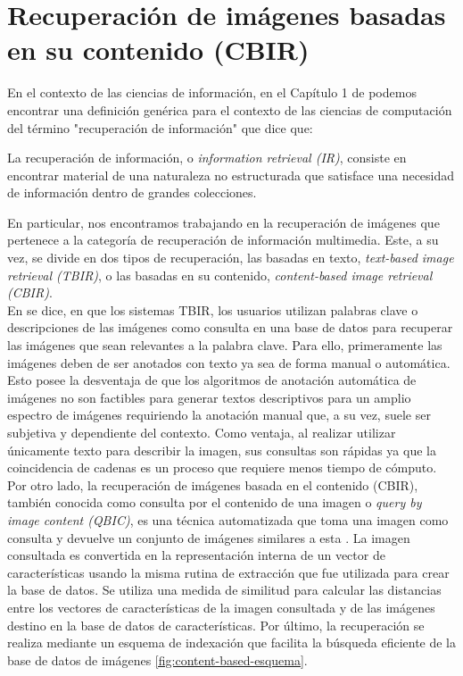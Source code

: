 \chapter{Recuperación de imágenes basadas en su contenido (CBIR)}

En el contexto de las ciencias de información, en el Capítulo 1 de \cite{10.5555/1394399} podemos encontrar una definición genérica para el contexto de las ciencias de computación del término "recuperación de información" que dice que:

\begin{definicion}
La recuperación de información, o \emph{information retrieval (IR)}, consiste en encontrar material de una naturaleza no estructurada que satisface una necesidad de información dentro de grandes colecciones.
\end{definicion}

En particular, nos encontramos trabajando en la recuperación de imágenes que pertenece a la categoría de recuperación de información multimedia. Este, a su vez, se divide en dos tipos de recuperación, las basadas en texto, \emph{text-based image retrieval (TBIR)}, o las basadas en su contenido, \emph{content-based image retrieval (CBIR)}.\\

En \cite{content-based} se dice, en que los sistemas TBIR, los usuarios utilizan palabras clave o descripciones de las imágenes como consulta en una base de datos para recuperar las imágenes que sean relevantes a la palabra clave. Para ello, primeramente las imágenes deben de ser anotados con texto ya sea de forma manual o automática. Esto posee la desventaja de que los algoritmos de anotación automática de imágenes no son factibles para generar textos descriptivos para un amplio espectro de imágenes requiriendo la anotación manual que, a su vez, suele ser subjetiva y dependiente del contexto. Como ventaja, al realizar utilizar únicamente texto para describir la imagen, sus consultas son rápidas ya que la coincidencia de cadenas es un proceso que requiere menos tiempo de cómputo.\\

Por otro lado, la recuperación de imágenes basada en el contenido (CBIR), también conocida como consulta por el contenido de una imagen o \emph{query by image content (QBIC)}, es una técnica automatizada que toma una imagen como consulta y devuelve un conjunto de imágenes similares a esta \cite{content-based}. La imagen consultada es convertida en la representación interna de un vector de características usando la misma rutina de extracción que fue utilizada para crear la base de datos. Se utiliza una medida de similitud para calcular las distancias entre los vectores de características de la imagen consultada y de las imágenes destino en la base de datos de características. Por último, la recuperación se realiza mediante un esquema de indexación que facilita la búsqueda eficiente de la base de datos de imágenes \autoref{fig:content-based-esquema}.\\

